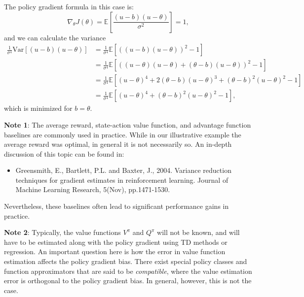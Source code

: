 The policy gradient formula in this case is:
\begin{equation*}
        \nabla_\theta J(\theta) = \mathbb{E} [\frac{(u-b)(u - \theta)}{\sigma^2}] = 1, 
\end{equation*}
and we can calculate the variance
\begin{equation*}
\begin{split}
        \frac{1}{\sigma^4}\textrm{Var}\left[(u-b)(u - \theta)\right]  
        &=\frac{1}{\sigma^4}\mathbb{E}\left[\left((u-b)(u - \theta)\right)^2 - 1\right] \\
        &=\frac{1}{\sigma^4}\mathbb{E}\left[\left((u-\theta)(u - \theta) + (\theta-b)(u - \theta)\right)^2 - 1\right] \\
        &=\frac{1}{\sigma^4}\mathbb{E}\left[(u-\theta)^4 + 2(\theta-b)(u - \theta)^3 + (\theta-b)^2(u - \theta)^2 - 1\right] \\
        &=\frac{1}{\sigma^4}\mathbb{E}\left[(u-\theta)^4 + (\theta-b)^2(u - \theta)^2 - 1\right],
\end{split}
\end{equation*}
which is minimized for $b=\theta$.

\textbf{Note 1}: The average reward, state-action value function, and advantage function baselines are commonly used in practice. While in our illustrative example the average reward was optimal, in general it is not necessarily so. An in-depth discussion of this topic can be found in:  
\begin{itemize}
  \item Greensmith, E., Bartlett, P.L. and Baxter, J., 2004. Variance reduction techniques for gradient estimates in reinforcement learning. Journal of Machine Learning Research, 5(Nov), pp.1471-1530.
\end{itemize}
Nevertheless, these baselines often lead to significant performance gains in practice.

\textbf{Note 2}: Typically, the value functions $V^\pi$ and $Q^\pi$ will not be known, and will have to be estimated along with the policy gradient using TD methods or regression. An important question here is how the error in value function estimation affects the policy gradient bias. There exist special policy classes and function approximators that are said to be \textit{compatible}, where the value estimation error is orthogonal to the policy gradient bias. In general, however, this is not the case. 


